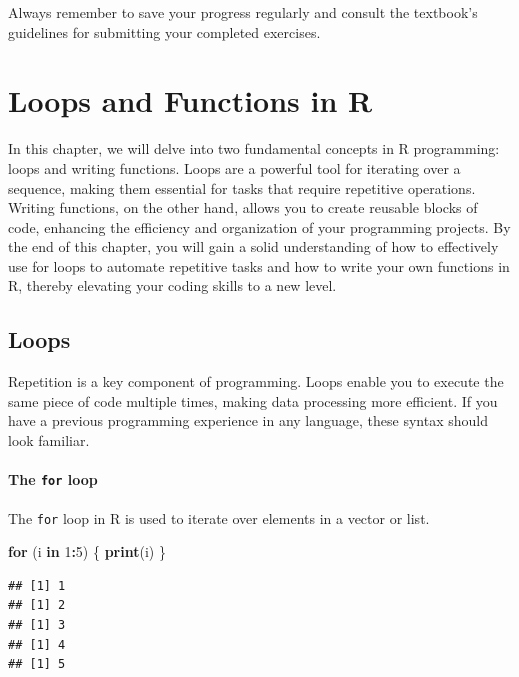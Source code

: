 \documentclass[
]{book}
\newenvironment{Shaded}{\begin{snugshade}}{\end{snugshade}}
\newcommand{\ControlFlowTok}[1]{\textcolor[rgb]{0.13,0.29,0.53}{\textbf{#1}}}
\newcommand{\DecValTok}[1]{\textcolor[rgb]{0.00,0.00,0.81}{#1}}
\newcommand{\FunctionTok}[1]{\textcolor[rgb]{0.13,0.29,0.53}{\textbf{#1}}}
\newcommand{\NormalTok}[1]{#1}
\newcommand{\SpecialCharTok}[1]{\textcolor[rgb]{0.81,0.36,0.00}{\textbf{#1}}}
\begin{document}
Always remember to save your progress regularly and consult the textbook's guidelines for submitting your completed exercises.

\hypertarget{loops-and-functions-in-r}{%
\chapter{Loops and Functions in R}\label{loops-and-functions-in-r}}

In this chapter, we will delve into two fundamental concepts in R programming: loops and writing functions. Loops are a powerful tool for iterating over a sequence, making them essential for tasks that require repetitive operations. Writing functions, on the other hand, allows you to create reusable blocks of code, enhancing the efficiency and organization of your programming projects. By the end of this chapter, you will gain a solid understanding of how to effectively use for loops to automate repetitive tasks and how to write your own functions in R, thereby elevating your coding skills to a new level.

\hypertarget{loops}{%
\section{Loops}\label{loops}}

Repetition is a key component of programming. Loops enable you to execute the same piece of code multiple times, making data processing more efficient. If you have a previous programming experience in any language, these syntax should look familiar.

\hypertarget{the-for-loop}{%
\subsubsection{\texorpdfstring{The \texttt{for} loop}{The for loop}}\label{the-for-loop}}

The \texttt{for} loop in R is used to iterate over elements in a vector or list.

\begin{Shaded}
\begin{Highlighting}[]
\ControlFlowTok{for}\NormalTok{ (i }\ControlFlowTok{in} \DecValTok{1}\SpecialCharTok{:}\DecValTok{5}\NormalTok{) \{}
  \FunctionTok{print}\NormalTok{(i)}
\NormalTok{\}}
\end{Highlighting}
\end{Shaded}

\begin{verbatim}
## [1] 1
## [1] 2
## [1] 3
## [1] 4
## [1] 5
\end{verbatim}
\end{document}

